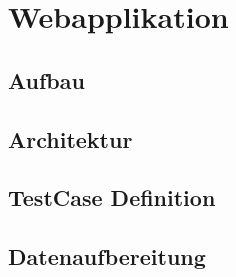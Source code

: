 %
%
%
%

\section{Webapplikation}


\subsection{Aufbau}

\subsection{Architektur}

\subsection{TestCase Definition}

\subsection{Datenaufbereitung}

